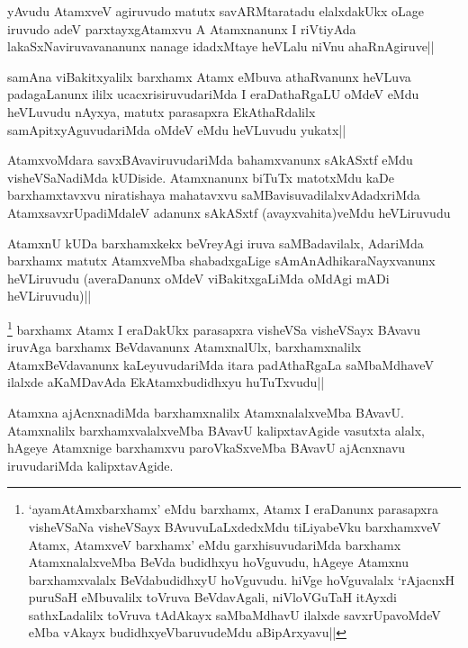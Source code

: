 
\begin{artha}
yAvudu AtamxveV agiruvudo matutx savARMtaratadu elalxdakUkx oLage iruvudo adeV parxtayxgAtamxvu A Atamxnanunx I riVtiyAda lakaSxNaviruvavananunx nanage idadxMtaye heVLalu niVnu ahaRnAgiruve||
\end{artha}

\begin{artha}
samAna viBakitxyalilx barxhamx Atamx eMbuva athaRvanunx heVLuva padagaLanunx ililx ucacxrisiruvudariMda I eraDathaRgaLU oMdeV eMdu heVLuvudu nAyxya, matutx parasapxra EkAthaRdalilx samApitxyAguvudariMda oMdeV eMdu heVLuvudu yukatx||
\end{artha}

\begin{artha}%
AtamxvoMdara savxBAvaviruvudariMda bahamxvanunx sAkASxtf eMdu visheVSaNadiMda kUDiside. Atamxnanunx biTuTx matotxMdu kaDe barxhamxtavxvu niratishaya mahatavxvu saMBavisuvadilalxvAdadxriMda AtamxsavxrUpadiMdaleV adanunx sAkASxtf (avayxvahita)veMdu heVLiruvudu
\end{artha}

\begin{artha}
AtamxnU kUDa barxhamxkekx beVreyAgi iruva saMBadavilalx, AdariMda barxhamx matutx AtamxveMba shabadxgaLige sAmAnAdhikaraNayxvanunx heVLiruvudu (averaDanunx oMdeV viBakitxgaLiMda oMdAgi mADi heVLiruvudu)||
\end{artha}

\begin{artha}
\footnote[1]{`ayamAtAmxbarxhamx' eMdu barxhamx, Atamx I eraDanunx parasapxra visheVSaNa visheVSayx BAvuvuLaLxdedxMdu tiLiyabeVku barxhamxveV Atamx, AtamxveV barxhamx' eMdu garxhisuvudariMda barxhamx AtamxnalalxveMba BeVda budidhxyu hoVguvudu, hAgeye Atamxnu barxhamxvalalx BeVdabudidhxyU hoVguvudu. hiVge hoVguvalalx `rAjacnxH puruSaH eMbuvalilx toVruva BeVdavAgali, niVloVGuTaH itAyxdi sathxLadalilx toVruva tAdAkayx saMbaMdhavU ilalxde savxrUpavoMdeV eMba vAkayx budidhxyeVbaruvudeMdu aBipArxyavu||} barxhamx Atamx I eraDakUkx parasapxra visheVSa visheVSayx BAvavu iruvAga barxhamx BeVdavanunx AtamxnalUlx, barxhamxnalilx AtamxBeVdavanunx kaLeyuvudariMda itara padAthaRgaLa saMbaMdhaveV ilalxde aKaMDavAda EkAtamxbudidhxyu huTuTxvudu|| 
\end{artha}

\begin{artha}%
Atamxna ajAcnxnadiMda barxhamxnalilx AtamxnalalxveMba BAvavU. Atamxnalilx barxhamxvalalxveMba BAvavU kalipxtavAgide vasutxta alalx, hAgeye Atamxnige barxhamxvu paroVkaSxveMba BAvavU ajAcnxnavu iruvudariMda kalipxtavAgide. 
\end{artha}

